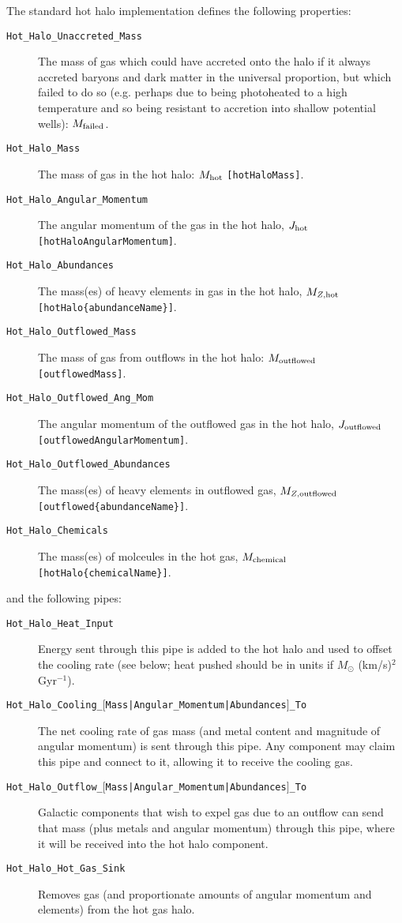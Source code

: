The standard hot halo implementation defines the following properties:
\begin{description}
 \item [{\tt Hot\_Halo\_Unaccreted\_Mass}] The mass of gas which could have accreted onto the halo if it always accreted baryons and dark matter in the universal proportion, but which failed to do so (e.g. perhaps due to being photoheated to a high temperature and so being resistant to accretion into shallow potential wells): $M_{\rm failed}$.
 \item [{\tt Hot\_Halo\_Mass}] The mass of gas in the hot halo: $M_{\rm hot}$ {\tt [hotHaloMass]}.
 \item [{\tt Hot\_Halo\_Angular\_Momentum}] The angular momentum of the gas in the hot halo, $J_{\rm hot}$ {\tt [hotHaloAngularMomentum]}.
 \item [{\tt Hot\_Halo\_Abundances}] The mass(es) of heavy elements in gas in the hot halo, $M_{Z, {\rm hot}}$ {\tt [hotHalo\{abundanceName\}]}.
 \item [{\tt Hot\_Halo\_Outflowed\_Mass}] The mass of gas from outflows in the hot halo: $M_{\rm outflowed}$ {\tt [outflowedMass]}.
 \item [{\tt Hot\_Halo\_Outflowed\_Ang\_Mom}] The angular momentum of the outflowed gas in the hot halo, $J_{\rm outflowed}$ {\tt [outflowedAngularMomentum]}.
 \item [{\tt Hot\_Halo\_Outflowed\_Abundances}] The mass(es) of heavy elements in outflowed gas, $M_{Z, {\rm outflowed}}$ {\tt [outflowed\{abundanceName\}]}.
 \item [{\tt Hot\_Halo\_Chemicals}] The mass(es) of molceules in the hot gas, $M_{\rm chemical}$ {\tt [hotHalo\{chemicalName\}]}.
\end{description}
and the following pipes:
\begin{description}
 \item [{\tt Hot\_Halo\_Heat\_Input}] Energy sent through this pipe is added to the hot halo and used to offset the cooling rate (see below; heat pushed should be in units if $M_\odot$ (km/s)$^2$ Gyr$^{-1}$).
 \item [{\tt Hot\_Halo\_Cooling\_$[$Mass|Angular\_Momentum|Abundances$]$\_To}] The net cooling rate of gas mass (and metal content and magnitude of angular momentum) is sent through this pipe. Any component may claim this pipe and connect to it, allowing it to receive the cooling gas.
 \item [{\tt Hot\_Halo\_Outflow\_$[$Mass|Angular\_Momentum|Abundances$]$\_To}] Galactic components that wish to expel gas due to an outflow can send that mass (plus metals and angular momentum) through this pipe, where it will be received into the hot halo component. 
 \item [{\tt Hot\_Halo\_Hot\_Gas\_Sink}] Removes gas (and proportionate amounts of angular momentum and elements) from the hot gas halo.
\end{description}

